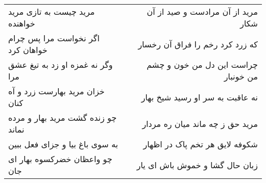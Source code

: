 \begin{center}
\begin{longtable}{l p{0.5cm} r}
مرید چیست به تازی مرید خواهنده
&&
مرید از آن مرادست و صید از آن شکار
\\
اگر نخواست مرا پس چرام خواهان کرد
&&
که زرد کرد رخم را فراق آن رخسار
\\
وگر نه غمزه او زد به تیغ عشق مرا
&&
چراست این دل من خون و چشم من خونبار
\\
خزان مرید بهارست زرد و آه کنان
&&
نه عاقبت به سر او رسید شیخ بهار
\\
چو زنده گشت مرید بهار و مرده نماند
&&
مرید حق ز چه ماند میان ره مردار
\\
به سوی باغ بیا و جزای فعل ببین
&&
شکوفه لایق هر تخم پاک در اظهار
\\
چو واعظان خضرکسوه بهار ای جان
&&
زبان حال گشا و خموش باش ای یار
\\
\end{longtable}
\end{center}
